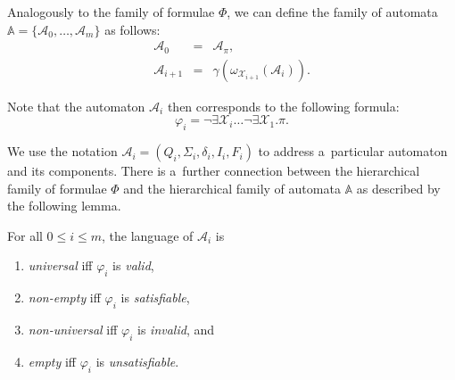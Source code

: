 % 


Analogously to the family of formulae $\Phi$, we can define
the family of automata $\mathbb{A} = \{\mathcal{A}_0,\ldots,\mathcal{A}_m\}$ as follows:
 \begin{eqnarray}
  \mathcal{A}_0 & = & \mathcal{A}_\pi,\\
  \mathcal{A}_{i+1} & = & \gamma(\omega_{\mathcal{X}_{i+1}}(\mathcal{A}_i)).
 \end{eqnarray}
 
 Note that the automaton $\mathcal{A}_i$ then corresponds to the following
formula:
 \begin{equation} \varphi_i =
 \neg\exists\mathcal{X}_i\ldots\neg\exists\mathcal{X}_1.
 \pi.
 \end{equation}
 
 We use the notation $\mathcal{A}_i = (Q_i, \Sigma_i, \delta_i, I_i, F_i)$ to
 address a~particular automaton and its components.
There is a~further connection between the hierarchical family of formulae $\Phi$
and the hierarchical family of automata $\mathbb{A}$ as described by the
following lemma.
 \begin{lemma}\label{uni-valid} For all $0 \leq i \leq m$, the language of
$\mathcal{A}_i$ is
\begin{enumerate}
  \item \emph{universal} iff $\varphi_i$ is \emph{valid},
  \item \emph{non-empty} iff $\varphi_i$ is \emph{satisfiable},
  \item \emph{non-universal} iff $\varphi_i$ is \emph{invalid}, and
  \item \emph{empty} iff $\varphi_i$ is \emph{unsatisfiable}.
\end{enumerate}
\end{lemma}

